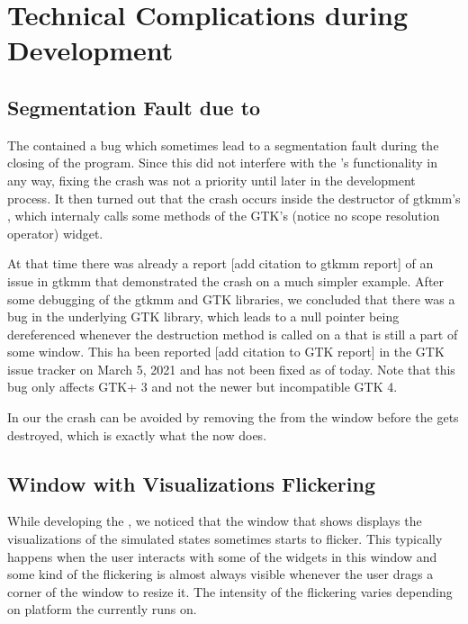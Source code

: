 \documentclass[11pt,a4paper,twoside,openright]{report}
\begin{document}
\section{Technical Complications during Development}

\subsection{Segmentation Fault due to }

The \software{} contained a bug which sometimes lead to a segmentation fault during the closing of the program. Since this did not interfere with the \software{}'s functionality in any way, fixing the crash was not a priority until later in the development process. It then turned out that the crash occurs inside the destructor of gtkmm's , which internaly calls some methods of the GTK's  (notice no scope resolution operator) widget.

At that time there was already a report [add citation to gtkmm report] of an issue in gtkmm that demonstrated the crash on a much simpler example. After some debugging of the gtkmm and GTK libraries, we concluded that there was a bug in the underlying GTK library, which leads to a null pointer being dereferenced whenever the destruction method is called on a  that is still a part of some window. This ha been reported [add citation to GTK report] in the GTK issue tracker on March 5, 2021 and has not been fixed as of today. Note that this bug only affects GTK+ 3 and not the newer but incompatible GTK 4.

In our \software{} the crash can be avoided by removing the  from the window before the  gets destroyed, which is exactly what the \software{} now does.

\subsection{Window with Visualizations Flickering}
While developing the \software{}, we noticed that the window that shows displays the visualizations of the simulated states sometimes starts to flicker. This typically happens when the user interacts with some of the widgets in this window and some kind of the flickering is almost always visible whenever the user drags a corner of the window to resize it. The intensity of the flickering varies depending on platform the \software{} currently runs on.
\end{document}
